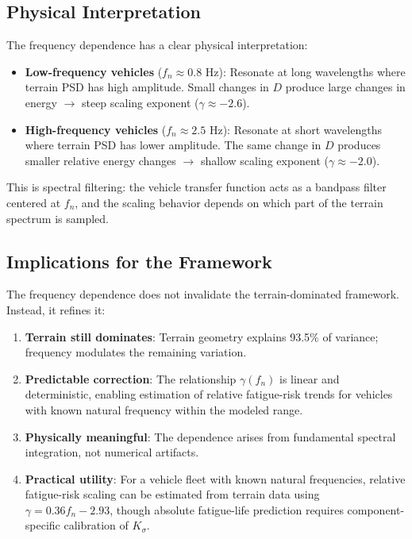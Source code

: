 \documentclass[11pt]{article}
\begin{document}
\subsection{Physical Interpretation}

The frequency dependence has a clear physical interpretation:

\begin{itemize}
\item \textbf{Low-frequency vehicles} ($f_n \approx 0.8$ Hz): Resonate at long wavelengths where terrain PSD has high amplitude. Small changes in $D$ produce large changes in energy $\rightarrow$ steep scaling exponent ($\gamma \approx -2.6$).

\item \textbf{High-frequency vehicles} ($f_n \approx 2.5$ Hz): Resonate at short wavelengths where terrain PSD has lower amplitude. The same change in $D$ produces smaller relative energy changes $\rightarrow$ shallow scaling exponent ($\gamma \approx -2.0$).
\end{itemize}

This is spectral filtering: the vehicle transfer function acts as a bandpass filter centered at $f_n$, and the scaling behavior depends on which part of the terrain spectrum is sampled.

\subsection{Implications for the Framework}

The frequency dependence does not invalidate the terrain-dominated framework. Instead, it refines it:

\begin{enumerate}
\item \textbf{Terrain still dominates}: Terrain geometry explains 93.5\% of variance; frequency modulates the remaining variation.

\item \textbf{Predictable correction}: The relationship $\gamma(f_n)$ is linear and deterministic, enabling estimation of relative fatigue-risk trends for vehicles with known natural frequency within the modeled range.

\item \textbf{Physically meaningful}: The dependence arises from fundamental spectral integration, not numerical artifacts.

\item \textbf{Practical utility}: For a vehicle fleet with known natural frequencies, relative fatigue-risk scaling can be estimated from terrain data using $\gamma = 0.36 f_n - 2.93$, though absolute fatigue-life prediction requires component-specific calibration of $K_\sigma$.
\end{enumerate}
\end{document}
